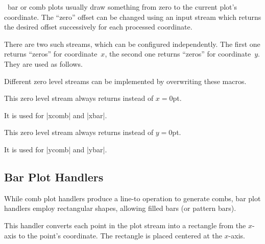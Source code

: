\pgfname\ bar or comb plots usually draw something from zero to the
current plot's coordinate. The ``zero'' offset can be changed using an
input stream which returns the desired offset successively for each
processed coordinate. 

There are two such streams, which can be configured independently.
The first one returns ``zeros'' for coordinate~$x$, the second one
returns ``zeros'' for coordinate~$y$. They are used as follows.

\begin{codeexample}
\pgfplotxzerolevelstreamstart
\pgfplotxzerolevelstreamnext %
\pgfplotxzerolevelstreamnext
\pgfplotxzerolevelstreamnext
\pgfplotxzerolevelstreamend
\end{codeexample}
%
\begin{codeexample}
\pgfplotyzerolevelstreamstart
\pgfplotyzerolevelstreamnext %
\pgfplotyzerolevelstreamend
\end{codeexample}
Different zero level streams can be implemented by overwriting these macros.

\begin{command}{\pgfplotxzerolevelstreamconstant{}}
  This zero level stream always returns  instead of
  $x=0$pt. 

  It is used for |xcomb| and |xbar|.
\end{command}

\begin{command}{\pgfplotyzerolevelstreamconstant{}}
  This zero level stream always returns  instead of
  $y=0$pt. 

  It is used for |ycomb| and |ybar|.
\end{command}

\subsection{Bar Plot Handlers}
\label{section-plotlib-bar-handlers}

While comb plot handlers produce a line-to operation to generate
combs, bar plot handlers employ rectangular shapes, allowing filled
bars (or pattern bars). 

\begin{command}{\pgfplothandlerybar}
  This handler converts each point in the plot stream into a rectangle
  from the $x$-axis to the point's coordinate. The rectangle is placed
  centered at the $x$-axis. 
  
\begin{codeexample}[]
\end{codeexample}
\end{command}

